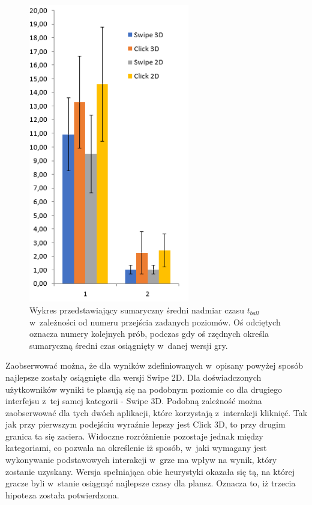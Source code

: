 \documentclass[a4paper,12pt,numbers=noenddot]{report}
\begin{document}
\begin{figure}[h!]
	\centering
  	\includegraphics[width=7cm]{diag/tBall_sum.png}
	\caption{Wykres przedstawiający sumaryczny średni nadmiar czasu $t_{ball}$ w~zależności od numeru przejścia zadanych poziomów. Oś odciętych oznacza numery kolejnych prób, podczas gdy oś rzędnych określa sumaryczną średni czas osiągnięty w~danej wersji gry.}
	\label{fig:diag_tball_sum}
\end{figure}

Zaobserwować można, że dla wyników zdefiniowanych w~opisany powyżej sposób najlepsze zostały osiągnięte dla wersji Swipe 2D. Dla doświadczonych użytkowników wyniki te plasują się na podobnym poziomie co dla drugiego interfejsu z~tej samej kategorii - Swipe 3D. Podobną zależność można zaobserwować dla tych dwóch aplikacji, które korzystają z~interakcji kliknięć. Tak jak przy pierwszym podejściu wyraźnie lepszy jest Click 3D, to przy drugim granica ta się zaciera. Widoczne rozróżnienie pozostaje jednak między kategoriami, co pozwala na określenie iż sposób, w~jaki wymagany jest wykonywanie podstawowych interakcji w~grze ma wpływ na wynik, który zostanie uzyskany. Wersja spełniająca obie heurystyki okazała się tą, na której gracze byli w~stanie osiągnąć najlepsze czasy dla plansz. Oznacza to, iż trzecia hipoteza została potwierdzona.


\end{document}
